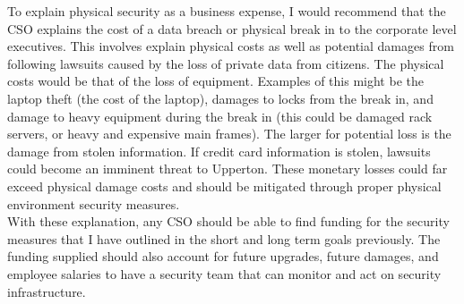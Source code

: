 \documentclass[paper=a4, fontsize=11pt]{scrartcl} %
\numberwithin{equation}{section} %
\numberwithin{figure}{section} %
\numberwithin{table}{section} %
\begin{document}
To explain physical security as a business expense, I would recommend that the CSO explains
the cost of a data breach or physical break in to the corporate level executives. This involves
explain physical costs as well as potential damages from following lawsuits caused by the
loss of private data from citizens. The physical costs would be that of the loss of equipment.
Examples of this might be the laptop theft (the cost of the laptop), damages to locks from
the break in, and damage to heavy equipment during the break in (this could be damaged rack
servers, or heavy and expensive main frames). The larger for potential loss is the damage from
stolen information. If credit card information is stolen, lawsuits could become an imminent
threat to Upperton. These monetary losses could far exceed physical damage costs and should
be mitigated through proper physical environment security measures.\\

With these explanation, any CSO should be able to find funding for the security measures
that I have outlined in the short and long term goals previously. The funding supplied
should also account for future upgrades, future damages, and employee salaries to have
a security team that can monitor and act on security infrastructure.
\end{document}
